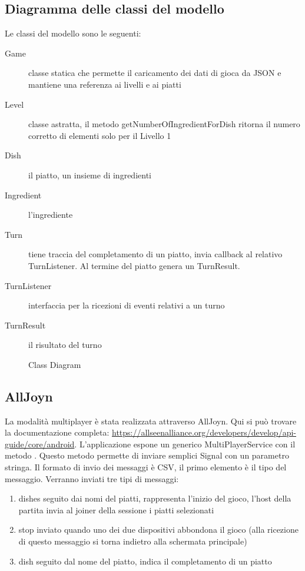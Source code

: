 \subsection{Diagramma delle classi del modello}

Le classi del modello sono le seguenti:
\begin{description}
\item[Game] classe statica che permette il caricamento dei dati di gioca da JSON e mantiene una referenza ai livelli e ai piatti

\item[Level] classe astratta, il metodo getNumberOfIngredientForDish ritorna il numero corretto di elementi solo per il Livello 1

\item[Dish] il piatto, un insieme di ingredienti

\item[Ingredient] l’ingrediente

\item[Turn] tiene traccia del completamento di un piatto, invia callback al relativo TurnListener. Al termine del piatto genera un TurnResult.

\item[TurnListener] interfaccia per la ricezioni di eventi relativi a un turno

\item[TurnResult] il risultato del turno
\end{description}

\begin{figure}[h!]
\label{fig:uml}
\centering
{}
\caption{Class Diagram}
\end{figure}

\subsection{AllJoyn}
La modalità multiplayer è stata realizzata attraverso AllJoyn. Qui si può trovare la documentazione completa: \url{https://allseenalliance.org/developers/develop/api-guide/core/android}.
L’applicazione espone un generico MultiPlayerService con il metodo . Questo metodo permette di inviare semplici Signal con un parametro stringa.
Il formato di invio dei messaggi è CSV, il primo elemento è il tipo del messaggio.
Verranno inviati tre tipi di messaggi:
\begin{enumerate}
\item dishes seguito dai nomi del piatti, rappresenta l’inizio del gioco, l’host della partita invia al joiner della sessione i piatti selezionati
\item stop inviato quando uno dei due dispositivi abbondona il gioco (alla ricezione di questo messaggio si torna indietro alla schermata principale)
\item dish seguito dal nome del piatto, indica il completamento di un piatto
\end{enumerate}

